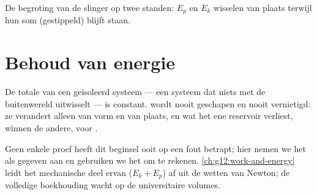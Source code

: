 \begin{omfigure}
\qquad
{}

{\small De begroting van de slinger op twee standen: $E_p$ en $E_k$
wisselen van plaats terwijl hun som (gestippeld) blijft staan.}
\end{omfigure}

\section{Behoud van energie}

\begin{theorem}\label{thm:g10:energy-conservation:conservation}
De totale  van een geïsoleerd systeem --- een systeem dat niets
met de buitenwereld uitwisselt --- is constant.  wordt nooit
geschapen en nooit vernietigd: ze verandert alleen van vorm en van
plaats, en wat het ene reservoir verliest, winnen de andere,  voor
.
\end{theorem}
\admitted

\begin{remark}\label{rem:g10:energy-conservation:admitted}
Geen enkele proef heeft dit beginsel ooit op een fout betrapt; hier nemen
we het als gegeven aan en gebruiken we het om te rekenen.
\cref{ch:g12:work-and-energy} leidt het mechanische deel ervan
($E_k + E_p$) af uit de wetten van Newton; de volledige boekhouding wacht
op de universitaire volumes.
\end{remark}

